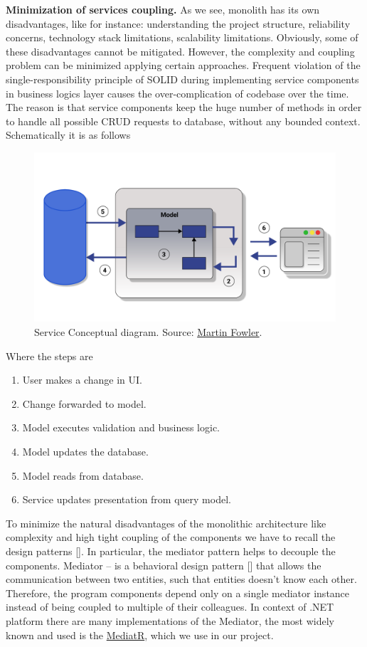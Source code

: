 \textbf{Minimization of services coupling.} As we see, monolith has its own disadvantages, like for instance: understanding the project structure, reliability concerns,
technology stack limitations, scalability limitations.
Obviously, some of these disadvantages cannot be mitigated.
However, the complexity and coupling problem can be minimized applying certain approaches.
Frequent violation of the single-responsibility principle of SOLID during implementing service components
in business logics layer causes the over-complication of codebase over the time.
The reason is that service components keep the huge number of methods in order to handle all possible CRUD requests
to database, without any bounded context.
Schematically it is as follows
\begin{figure}[H]
    \centering
    \includegraphics[width=1\textwidth]{Pictures/Services}
    \caption{Service Conceptual diagram.
    Source: \href{https://martinfowler.com/bliki/CQRS.html}{Martin Fowler}.}\label{fig:figure9}
\end{figure}
Where the steps are
\begin{enumerate}
    \item User makes a change in UI\@.
    \item Change forwarded to model.
    \item Model executes validation and business logic.
    \item Model updates the database.
    \item Model reads from database.
    \item Service updates presentation from query model.
\end{enumerate}

To minimize the natural disadvantages of the monolithic architecture like complexity and high tight coupling of the components
we have to recall the design patterns [\cite{rising1998design}].
In particular, the mediator pattern helps to decouple the components.
Mediator -- is a behavioral design pattern [\cite{rasche2016building}] that allows the communication between two entities,
such that entities doesn't know each other.
Therefore, the program components depend only on a single mediator instance instead of being coupled to multiple of their
colleagues.
In context of .NET platform there are many implementations of the Mediator, the most widely known and used is the
\href{https://github.com/jbogard/MediatR}{MediatR}, which we use in our project.

